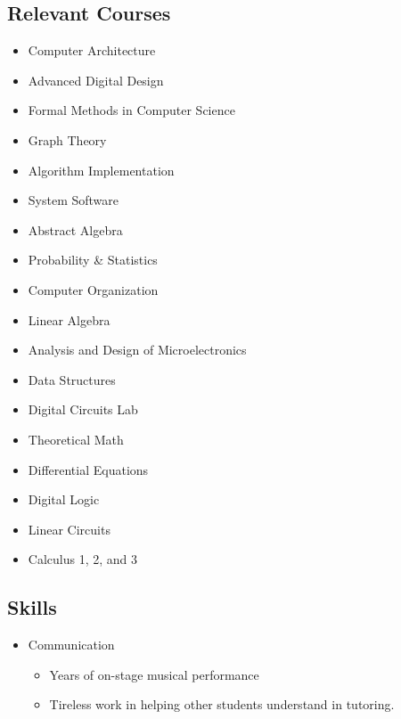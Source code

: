 \documentclass[18pt]{article}
\providecommand{\tightlist}{
    \setlength{\itemsep}{0pt}\setlength{\parskip}{0pt}
}
\begin{document}
  \begin{multicols}{2}
    
    \subsection*{Relevant Courses}\label{relevant-courses}
      \begin{itemize}
        \item Computer Architecture
        \item Advanced Digital Design
        \item Formal Methods in Computer Science
        \item Graph Theory
        \item Algorithm Implementation
        \item System Software
        \item Abstract Algebra
        \item Probability \& Statistics
        \item Computer Organization
        \item Linear Algebra
        \item Analysis and Design of Microelectronics
        \item Data Structures
        \item Digital Circuits Lab
        \item Theoretical Math
        \item Differential Equations
        \item Digital Logic
        \item Linear Circuits
        \item Calculus 1, 2, and 3
      \end{itemize} 
    
  \vfill
  \columnbreak
    
    \subsection*{Skills}\label{skills}
      \begin{itemize}\tightlist
        
        \item Communication
        \begin{itemize}\tightlist
          \item Years of on-stage musical performance
          \item Tireless work in helping other students understand in tutoring.
        \end{itemize}
        

\end{itemize}
\end{multicols}
\end{document}
